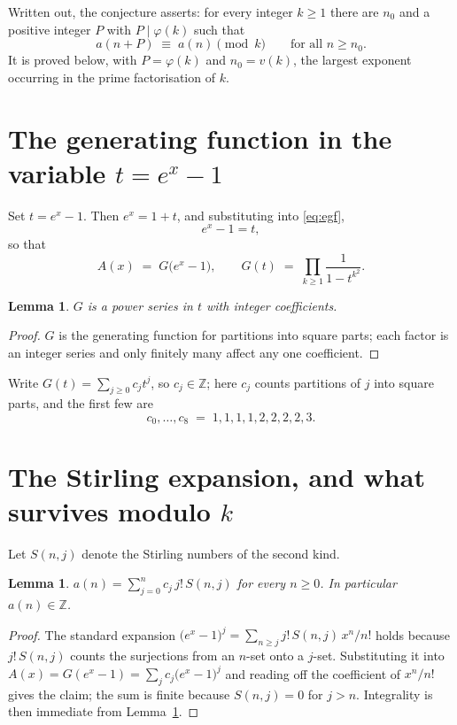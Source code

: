 \documentclass[11pt,a4paper]{article}
\theoremstyle{plain}
\newtheorem{lemma}[theorem]{Lemma}
\theoremstyle{definition}
\begin{document}
Written out, the conjecture asserts: for every integer $k\ge 1$ there are $n_0$ and a
positive integer $P$ with $P\mid\varphi(k)$ such that
\begin{equation}\label{eq:conj}
a(n+P)\;\equiv\;a(n)\pmod{k}\qquad\text{for all } n\ge n_0 .
\end{equation}
It is proved below, with $P=\varphi(k)$ and $n_0=v(k)$, the largest exponent occurring in
the prime factorisation of $k$.

\section{The generating function in the variable $t=e^{x}-1$}

Set $t=e^{x}-1$. Then $e^{x}=1+t$, and substituting into \eqref{eq:egf},
\[
e^{x}-1=t,
\]
so that
\begin{equation}\label{eq:G}
A(x)\;=\;G\bigl(e^{x}-1\bigr),\qquad
G(t)\;=\;\prod_{k\ge 1}\frac{1}{1-t^{k^{2}}}.
\end{equation}

\begin{lemma}\label{lem:int}
$G$ is a power series in $t$ with integer coefficients.
\end{lemma}

\begin{proof}
$G$ is the generating function for partitions into square parts; each factor is an integer series and only finitely many affect any one coefficient.
\end{proof}

Write $G(t)=\sum_{j\ge0}c_j t^{j}$, so $c_j\in\mathbb{Z}$; here $c_j$ counts partitions of $j$ into square parts, and the
first few are
\[
c_0,\dots,c_8 \;=\; 1, 1, 1, 1, 2, 2, 2, 2, 3.
\]

\section{The Stirling expansion, and what survives modulo $k$}

Let $S(n,j)$ denote the Stirling numbers of the second kind.

\begin{lemma}\label{lem:stir}
$a(n)=\sum_{j=0}^{n} c_j\, j!\, S(n,j)$ for every $n\ge 0$. In particular $a(n)\in\mathbb{Z}$.
\end{lemma}

\begin{proof}
The standard expansion $\bigl(e^{x}-1\bigr)^{j}
=\sum_{n\ge j} j!\,S(n,j)\,x^{n}/n!$ holds because $j!\,S(n,j)$ counts the surjections
from an $n$-set onto a $j$-set. Substituting it into
$A(x)=G(e^{x}-1)=\sum_j c_j\bigl(e^{x}-1\bigr)^{j}$ and reading off the coefficient of
$x^{n}/n!$ gives the claim; the sum is finite because $S(n,j)=0$ for $j>n$. Integrality is
then immediate from Lemma~\ref{lem:int}.
\end{proof}
\end{document}
